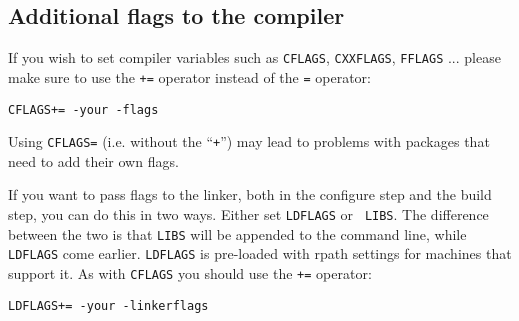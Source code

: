 \subsection{Additional flags to the compiler} %

If you wish  to set compiler variables   such as {\tt CFLAGS},  {\tt CXXFLAGS},
{\tt FFLAGS} ... please make sure to use  the {\tt +=}  operator instead of the
{\tt {=}} operator:

\begin{verbatim}
CFLAGS+= -your -flags
\end{verbatim}

Using {\tt CFLAGS=} (i.e.  without the ``{\tt +}'') may  lead to  problems with
packages that need to add their own flags.

If you want  to pass flags  to the linker, both in  the configure  step and the
build step, you  can do this  in  two ways.   Either set {\tt  LDFLAGS} or {\tt
LIBS}.  The difference between  the two is that  {\tt LIBS} will be appended to
the command line, while {\tt LDFLAGS} come earlier. {\tt LDFLAGS} is pre-loaded
with rpath settings   for machines that support  it.  As with {\tt CFLAGS}  you
should use the {\tt +=} operator:

\begin{verbatim}
LDFLAGS+= -your -linkerflags
\end{verbatim}
